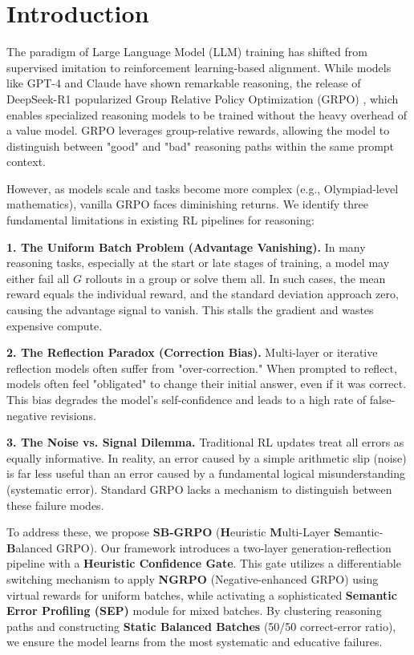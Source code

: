 \documentclass[runningheads]{llncs}
\begin{document}
\section{Introduction}

The paradigm of Large Language Model (LLM) training has shifted from supervised imitation to reinforcement learning-based alignment. While models like GPT-4 and Claude have shown remarkable reasoning, the release of DeepSeek-R1 popularized Group Relative Policy Optimization (GRPO) \cite{deepseekmath}, which enables specialized reasoning models to be trained without the heavy overhead of a value model. GRPO leverages group-relative rewards, allowing the model to distinguish between "good" and "bad" reasoning paths within the same prompt context.

However, as models scale and tasks become more complex (e.g., Olympiad-level mathematics), vanilla GRPO faces diminishing returns. We identify three fundamental limitations in existing RL pipelines for reasoning:

\textbf{1. The Uniform Batch Problem (Advantage Vanishing).} In many reasoning tasks, especially at the start or late stages of training, a model may either fail all $G$ rollouts in a group or solve them all. In such cases, the mean reward equals the individual reward, and the standard deviation approach zero, causing the advantage signal to vanish. This stalls the gradient and wastes expensive compute.

\textbf{2. The Reflection Paradox (Correction Bias).} Multi-layer or iterative reflection models \cite{mgrpo} often suffer from "over-correction." When prompted to reflect, models often feel "obligated" to change their initial answer, even if it was correct. This bias degrades the model's self-confidence and leads to a high rate of false-negative revisions.

\textbf{3. The Noise vs. Signal Dilemma.} Traditional RL updates treat all errors as equally informative. In reality, an error caused by a simple arithmetic slip (noise) is far less useful than an error caused by a fundamental logical misunderstanding (systematic error). Standard GRPO lacks a mechanism to distinguish between these failure modes.

To address these, we propose \textbf{SB-GRPO} (\textbf{H}euristic \textbf{M}ulti-Layer \textbf{S}emantic-\textbf{B}alanced GRPO). Our framework introduces a two-layer generation-reflection pipeline with a \textbf{Heuristic Confidence Gate}. This gate utilizes a differentiable switching mechanism to apply \textbf{NGRPO} (Negative-enhanced GRPO) \cite{ngrpo} using virtual rewards for uniform batches, while activating a sophisticated \textbf{Semantic Error Profiling (SEP)} module for mixed batches. By clustering reasoning paths and constructing \textbf{Static Balanced Batches} (50/50 correct-error ratio), we ensure the model learns from the most systematic and educative failures.
\end{document}
